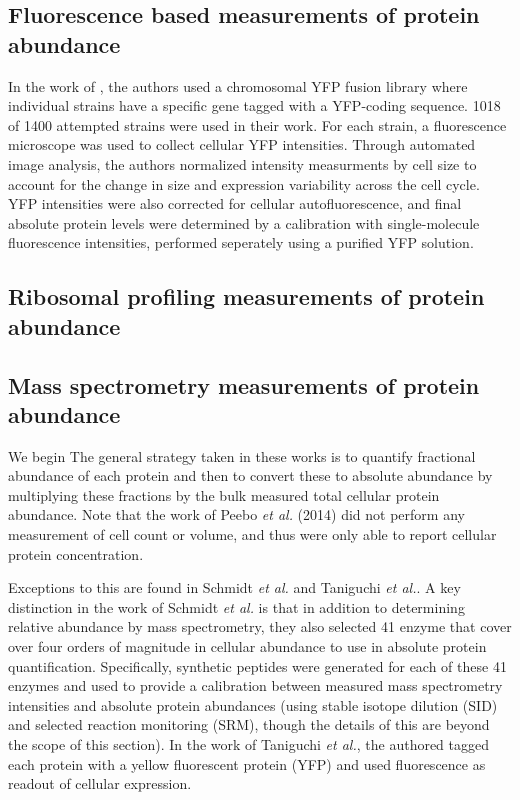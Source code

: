 \subsection{Fluorescence based measurements of protein abundance}
In the work of \cite{taniguchi2010}, the authors used a chromosomal YFP fusion
library where individual strains have a specific gene tagged with a YFP-coding
sequence. 1018 of 1400 attempted strains were used in their work. For each
strain, a fluorescence microscope was used to collect cellular YFP intensities.
Through automated image analysis, the authors normalized intensity measurments
by cell size to account for the change in size and expression variability across
the cell cycle. YFP intensities were also corrected for cellular
autofluorescence, and final absolute protein levels were determined by a
calibration with single-molecule fluorescence intensities, performed seperately
using a purified YFP solution.

\subsection{Ribosomal profiling measurements of protein abundance}





\subsection{Mass spectrometry measurements of protein abundance}


We begin The general strategy taken in these works is to quantify fractional
abundance of each protein and then to convert these to absolute abundance by
multiplying these fractions by the bulk measured total cellular protein
abundance. Note that the work of Peebo \textit{et al.} (2014) did not perform
any measurement of cell count or volume, and thus were only able to report
cellular protein concentration.

Exceptions to this are found in Schmidt \textit{et al.} and Taniguchi \textit{et al.}.
A key distinction in the work of Schmidt \textit{et al.} is that in addition to
determining relative abundance by mass spectrometry, they also selected 41
enzyme that cover over four orders of magnitude in cellular abundance to use in
absolute protein quantification. Specifically, synthetic peptides were generated
for each of these 41 enzymes and used to provide a calibration between measured
mass spectrometry intensities and absolute protein abundances (using stable
isotope dilution (SID) and selected reaction monitoring (SRM), though the
details of this are beyond the scope of this section). In the work of Taniguchi
\textit{et al.},  the authored tagged each protein with a  yellow fluorescent
protein (YFP) and used fluorescence as readout of cellular expression.



